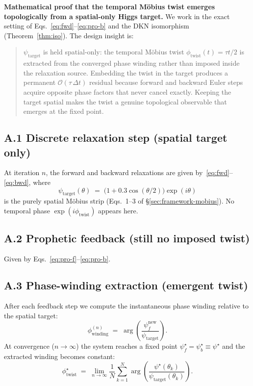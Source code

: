 \documentclass[11pt,a4paper]{article}
\theoremstyle{definition}
\theoremstyle{remark}
\newcommand{\psif}{\psi_{f}}
\newcommand{\psib}{\psi_{b}}
\newcommand{\psit}{\psi_{\mathrm{target}}}
\newcommand{\phitwist}{\phi_{\mathrm{twist}}}
\begin{document}
\textbf{Mathematical proof that the temporal M\"obius twist emerges
topologically from a spatial-only Higgs target.} We work in the exact
setting of Eqs.~\eqref{eq:fwd}--\eqref{eq:pro-b} and the DKN
isomorphism (Theorem~\ref{thm:iso}). The design insight is:
\begin{quote}
$\psit$ is held spatial-only: the temporal M\"obius twist
$\phitwist(t) = \tau t/2$ is extracted from the converged phase winding
rather than imposed inside the relaxation source. Embedding the twist
in the target produces a permanent $\mathcal{O}(\tau\,\Delta t)$
residual because forward and backward Euler steps acquire opposite
phase factors that never cancel exactly. Keeping the target spatial
makes the twist a genuine topological observable that emerges at the
fixed point.
\end{quote}

\subsection*{A.1 Discrete relaxation step (spatial target only)}
At iteration $n$, the forward and backward relaxations are
given by~\eqref{eq:fwd}--\eqref{eq:bwd}, where
\begin{equation}\label{eq:target}
  \psit(\theta) \;=\; \bigl(1 + 0.3\cos(\theta/2)\bigr)\exp(i\theta)
\end{equation}
is the purely spatial M\"obius strip (Eqs.~1--3 of
\S\ref{sec:framework-mobius}). No temporal phase $\exp(i\phitwist)$
appears here.

\subsection*{A.2 Prophetic feedback (still no imposed twist)}
Given by Eqs.~\eqref{eq:pro-f}--\eqref{eq:pro-b}.

\subsection*{A.3 Phase-winding extraction (emergent twist)}
After each feedback step we compute the instantaneous phase winding
relative to the spatial target:
\begin{equation}\label{eq:winding}
  \phi_{\mathrm{winding}}^{(n)}
  \;=\; \arg\!\left(\frac{\psif^{\mathrm{new}}}{\psit}\right).
\end{equation}
At convergence ($n \to \infty$) the system reaches a fixed point
$\psif^\star = \psib^\star \equiv \psi^\star$ and the extracted winding
becomes constant:
\begin{equation}\label{eq:phi-star}
  \phi_{\mathrm{twist}}^\star
  \;=\; \lim_{n\to\infty}\frac{1}{N}\sum_{k=1}^{N}
    \arg\!\left(\frac{\psi^\star(\theta_k)}{\psit(\theta_k)}\right).
\end{equation}
\end{document}
